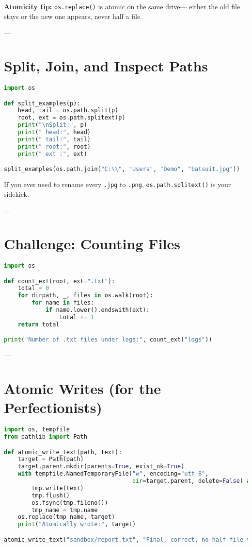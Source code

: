 \textbf{Atomicity tip:} \texttt{os.replace()} is atomic on the same drive—  
either the old file stays or the new one appears, never half a file.

---

\section{Split, Join, and Inspect Paths}

\begin{lstlisting}[language=Python, caption={Split and reassemble file paths.}]
import os

def split_examples(p):
    head, tail = os.path.split(p)
    root, ext = os.path.splitext(p)
    print("\nSplit:", p)
    print(" head:", head)
    print(" tail:", tail)
    print(" root:", root)
    print(" ext :", ext)

split_examples(os.path.join("C:\\", "Users", "Demo", "batsuit.jpg"))
\end{lstlisting}

If you ever need to rename every \texttt{.jpg} to \texttt{.png},  
\texttt{os.path.splitext()} is your sidekick.

---

\section{Challenge: Counting Files}

\begin{lstlisting}[language=Python, caption={Count all files with a given extension.}]
import os

def count_ext(root, ext=".txt"):
    total = 0
    for dirpath, _, files in os.walk(root):
        for name in files:
            if name.lower().endswith(ext):
                total += 1
    return total

print("Number of .txt files under logs:", count_ext("logs"))
\end{lstlisting}

---

\section{Atomic Writes (for the Perfectionists)}

\begin{lstlisting}[language=Python, caption={Write safely using a temporary file.}]
import os, tempfile
from pathlib import Path

def atomic_write_text(path, text):
    target = Path(path)
    target.parent.mkdir(parents=True, exist_ok=True)
    with tempfile.NamedTemporaryFile("w", encoding="utf-8",
                                     dir=target.parent, delete=False) as tmp:
        tmp.write(text)
        tmp.flush()
        os.fsync(tmp.fileno())
        tmp_name = tmp.name
    os.replace(tmp_name, target)
    print("Atomically wrote:", target)

atomic_write_text("sandbox/report.txt", "Final, correct, no-half-file version.\n")
\end{lstlisting}

